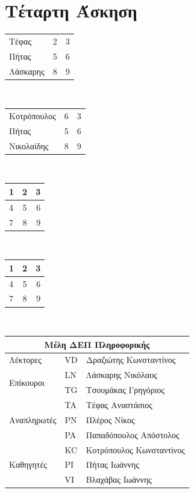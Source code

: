 \documentclass[a4paper,11pt]{article}
\newcommand{\lt}{\latintext}
\begin{document}
\section{Τέταρτη Άσκηση}
\vspace*{1 cm}
  \begin{center}
	\it {
	\begin{tabular}{ l c r }
  		Τέφας & 2 & 3 \\
  		Πήτας & 5 & 6 \\
  		Λάσκαρης & 8 & 9 \\
	\end{tabular}
\vspace*{1 cm}\\
	\begin{tabular}{| l | c | r |}
  		Κοτρόπουλος & 6 & 3 \\
  		Πήτας & 5 & 6 \\
  		Νικολαίδης & 8 & 9 \\
	\end{tabular}
\vspace*{1 cm}\\
	\begin{tabular}{ | l | c | r |}
    	\hline
    	1 & 2 & 3 \\ \hline
    	4 & 5 & 6 \\ \hline
    	7 & 8 & 9 \\ 
    	\hline
  	\end{tabular}
\vspace*{1 cm}\\
  	\begin{tabular}{ | l | c | r |}
    	\hline
    	1 & 2 & 3 \\ \hline
    	4 & 5 & 6 \\ \hline
    	7 & 8 & 9 \\ 
    	\hline
  	\end{tabular}
\vspace*{1 cm}\\
  	\begin{tabular}{| l | l |  l |}
  		\hline
  		\multicolumn{3}{|c|}{Μέλη ΔΕΠ Πληροφορικής} \\
  		\hline
 		Λέκτορες & \lt VD & Δραζιώτης Κωνσταντίνος \\
 		\hline
 		\multirow{2}{*}{Επίκουροι} & \lt LN & Λάσκαρης Νικόλαος \\ 
 		& \lt TG & Τσουμάκας Γρηγόριος \\ 
 		\hline
 		\multirow{3}{*}{Αναπληρωτές} & \lt TA & Τέφας Αναστάσιος \\ 
 		& \lt PN & Πλέρος Νίκος \\ 
 		& \lt PA & Παπαδόπουλος Απόστολος \\ 
 		\hline
 		\multirow{3}{*}{Καθηγητές} & \lt KC & Κοτρόπουλος Κωνσταντίνος \\ 
 		& \lt PI & Πήτας Ιωάννης \\ 
 		& \lt VI & Βλαχάβας Ιωάννης \\ 
 		\hline

	\end{tabular}}
  \end{center}   
\end{document}
